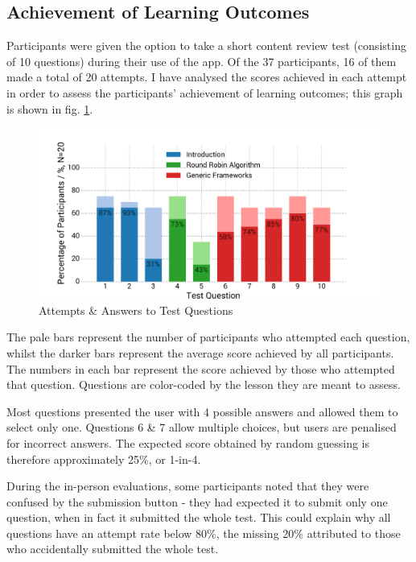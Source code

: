 \documentclass[bsc,twoside,singlespacing,parskip,logo,notimes,normalheadings]{infthesis}
\begin{document}
    \subsection{Achievement of Learning Outcomes}
    Participants were given the option to take a short content review
    test (consisting of 10 questions) during their use of the app. Of
    the 37 participants, 16 of them made a total of 20 attempts. I
    have analysed the scores achieved in each attempt in order to
    assess the participants' achievement of learning outcomes; this
    graph is shown in fig. \ref{fig:question-answers}.

    \begin{figure}[!tb]
      \centering
      \vspace{-6mm}
      \includegraphics[width=\textwidth, trim=0 0 30 20, clip]{img/question_scores.pdf}
      \captionsetup{width=\textwidth, justification=centering}
      \caption{Attempts \& Answers to Test Questions}\label{fig:question-answers}
    \end{figure}

    The pale bars represent the number of participants who attempted
    each question, whilst the darker bars represent the average score
    achieved by all participants. The numbers in each bar represent
    the score achieved by those who attempted that question. Questions
    are color-coded by the lesson they are meant to assess.

    Most questions presented the user with 4 possible answers and
    allowed them to select only one. Questions 6 \& 7 allow multiple
    choices, but users are penalised for incorrect answers. The
    expected score obtained by random guessing is therefore
    approximately 25\%, or 1-in-4.

    During the in-person evaluations, some participants noted that
    they were confused by the submission button - they had expected it
    to submit only one question, when in fact it submitted the whole
    test. This could explain why all questions have an attempt rate
    below 80\%, the missing 20\% attributed to those who accidentally
    submitted the whole test.
\end{document}
